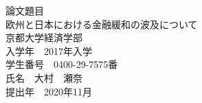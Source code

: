 \documentclass[12pt]{jarticle}
\begin{document}
\begin{titlepage}

  \centering
  {\huge 論文題目 \\ \vspace{40pt} 欧州と日本における金融緩和の波及について}\\ %
  \vspace{150truept}
  {\huge 京都大学経済学部}\\
  \vspace{40pt}
  {\huge 入学年　2017年入学}\\
  \vspace*{40pt}
  {\huge 学生番号　0400-29-7575番}\\ %
  \vspace{150truept}
  {\huge 氏名　大村　瀬奈}\\ %
  \vspace{40truept}
  {\huge 提出年　2020年11月}\\ %
\end{titlepage}

\thispagestyle{empty} %
\thispagestyle{empty} %

\vspace{80pt}
\end{document}
